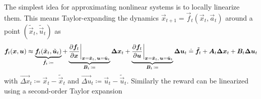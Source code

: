 		The simplest idea for approximating nonlinear systems is to locally linearize them. This means Taylor-expanding the dynamics \( \vec{x}_{t + 1} = \vec{f}_t(\vec{x}_t, \vec{a}_t) \) around a point \( (\tilde{\vec{x}}_t, \tilde{\vec{u}}_t) \) as
		\begin{equation*}
			\bm{f}_t(\bm{x}, \bm{u})
				\approx \underbrace{\bm{f}_t(\tilde{\bm{x}}_t, \tilde{\bm{u}}_t)}_{\tilde{\bm{f}}_t \,\coloneqq}
					+ \underbrace{\pdv{\bm{f}_t}{\bm{x}} \bigg\vert_{\bm{x} = \tilde{\bm{x}}_t,\, \bm{u} = \tilde{\bm{u}}_t}}_{\bm{B}_t \,\coloneqq} \bm{\Delta x}_t
					+ \underbrace{\pdv{\bm{f}_t}{\bm{u}} \bigg\vert_{\bm{x} = \tilde{\bm{x}}_t,\, \bm{u} = \tilde{\bm{u}}_t}}_{\bm{B}_t \,\coloneqq} \bm{\Delta u}_t
				\doteq \tilde{\bm{f}}_t + \bm{A}_t \bm{\Delta x}_t + \bm{B}_t \bm{\Delta u}_t
		\end{equation*}
		with \( \vec{\Delta x}_t \coloneqq \vec{x}_t - \tilde{\vec{x}}_t \) and \( \vec{\Delta u}_t \coloneqq \vec{u}_t - \tilde{\vec{u}}_t \). Similarly the reward can be linearized using a second-order Taylor expansion

